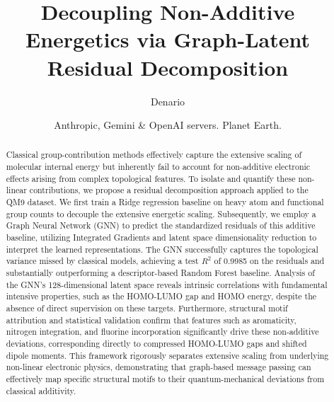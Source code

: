 \documentclass[]{article}
\begin{document}
\title{Decoupling Non-Additive Energetics via Graph-Latent Residual Decomposition}

\author{Denario}
\date{Anthropic, Gemini \& OpenAI servers. Planet Earth.}

\maketitle
\begin{abstract}
Classical group-contribution methods effectively capture the extensive scaling of molecular internal energy but inherently fail to account for non-additive electronic effects arising from complex topological features. To isolate and quantify these non-linear contributions, we propose a residual decomposition approach applied to the QM9 dataset. We first train a Ridge regression baseline on heavy atom and functional group counts to decouple the extensive energetic scaling. Subsequently, we employ a Graph Neural Network (GNN) to predict the standardized residuals of this additive baseline, utilizing Integrated Gradients and latent space dimensionality reduction to interpret the learned representations. The GNN successfully captures the topological variance missed by classical models, achieving a test $R^2$ of 0.9985 on the residuals and substantially outperforming a descriptor-based Random Forest baseline. Analysis of the GNN's 128-dimensional latent space reveals intrinsic correlations with fundamental intensive properties, such as the HOMO-LUMO gap and HOMO energy, despite the absence of direct supervision on these targets. Furthermore, structural motif attribution and statistical validation confirm that features such as aromaticity, nitrogen integration, and fluorine incorporation significantly drive these non-additive deviations, corresponding directly to compressed HOMO-LUMO gaps and shifted dipole moments. This framework rigorously separates extensive scaling from underlying non-linear electronic physics, demonstrating that graph-based message passing can effectively map specific structural motifs to their quantum-mechanical deviations from classical additivity.
\end{abstract}
\end{document}
